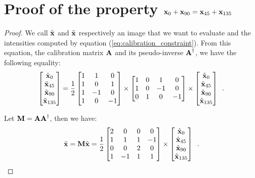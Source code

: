 \chapter{Proof of the property $\textbf{x}_0 + \textbf{x}_{90} = \textbf{x}_{45} + \textbf{x}_{135}$}
\label{app:physical_prop}

\begin{proof}
	We call $\hat{\textbf{x}}$ and $\tilde{\textbf{x}}$ respectively an image that we want to evaluate and the intensities computed by equation (\ref{eq:calibration_constraint}). From this equation, the calibration matrix $\ma$ and its pseudo-inverse $\ma^\dagger$, we have the following equality:
	\begin{equation}
			\label{eq:app_problem}
		\begin{bmatrix} 
			\tilde{\textbf{x}}_0 \\
			\tilde{\textbf{x}}_{45} \\	
			\tilde{\textbf{x}}_{90} \\
			\tilde{\textbf{x}}_{135} 
		\end{bmatrix} = \frac{1}{2}\begin{bmatrix}
			1 & 1 & 0 \\
			1 & 0 & 1 \\
			1 & -1 & 0 \\
			1 & 0 & -1
		\end{bmatrix}
		\times \begin{bmatrix}
			1 & 0 & 1 & 0 \\
			1 & 0 & -1 & 0 \\
			0 & 1 & 0 & -1
		\end{bmatrix} \times \begin{bmatrix} 
			\hat{\textbf{x}}_0 \\
			\hat{\textbf{x}}_{45} \\
			\hat{\textbf{x}}_{90} \\
			\hat{\textbf{x}}_{135}
		\end{bmatrix}\enspace.
	\end{equation}
	
	Let $\mm = \ma\ma^\dagger$, then we have:
	$$
	\tilde{\vx} = \mm\hat{\vx} = \frac{1}{2}\begin{bmatrix}
		2 & 0 & 0 & 0 \\
		1 & 1 & 1 & -1 \\
		0 & 0 & 2 & 0 \\
		1 & -1 & 1 & 1
	\end{bmatrix} \times \begin{bmatrix} 
		\hat{\vx}_0 \\
		\hat{\vx}_{45} \\
		\hat{\vx}_{90} \\
		\hat{\vx}_{135}
	\end{bmatrix} \enspace.
	$$
	

\end{proof}
